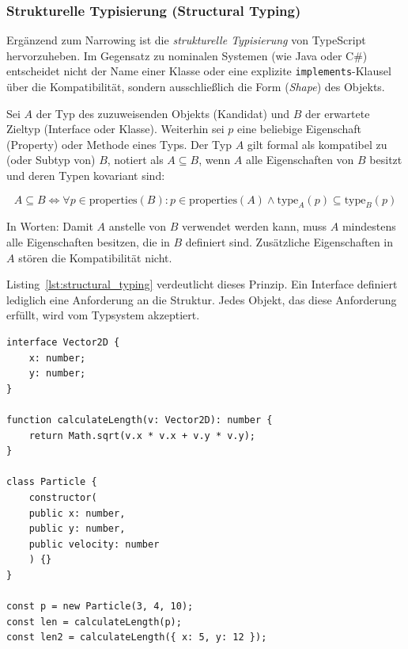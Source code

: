 \subsubsection{Strukturelle Typisierung (Structural Typing)}
Ergänzend zum Narrowing ist die \emph{strukturelle Typisierung} von TypeScript hervorzuheben. Im Gegensatz zu nominalen Systemen (wie Java oder C\#) entscheidet nicht der Name einer Klasse oder eine explizite \texttt{implements}-Klausel über die Kompatibilität, sondern ausschließlich die Form (\emph{Shape}) des Objekts.

Sei $A$ der Typ des zuzuweisenden Objekts (Kandidat) und $B$ der erwartete Zieltyp (Interface oder Klasse). Weiterhin sei $p$ eine beliebige Eigenschaft (Property) oder Methode eines Typs.
Der Typ $A$ gilt formal als kompatibel zu (oder Subtyp von) $B$, notiert als $A \subseteq B$, wenn $A$ alle Eigenschaften von $B$ besitzt und deren Typen kovariant sind:

\begin{equation}
	A \subseteq B \iff \forall p \in \text{properties}(B): p \in \text{properties}(A) \land \text{type}_A(p) \subseteq \text{type}_B(p)
	\label{eq:structural_typing}
\end{equation}

In Worten: Damit $A$ anstelle von $B$ verwendet werden kann, muss $A$ mindestens alle Eigenschaften besitzen, die in $B$ definiert sind. Zusätzliche Eigenschaften in $A$ stören die Kompatibilität nicht.

Listing~\ref{lst:structural_typing} verdeutlicht dieses Prinzip. Ein Interface definiert lediglich eine Anforderung an die Struktur. Jedes Objekt, das diese Anforderung erfüllt, wird vom Typsystem akzeptiert.

\begin{listing}[H]
	\caption{Implizite Kompatibilität ohne explizite Implementierung}
	\label{lst:structural_typing}
	\begin{verbatim}
interface Vector2D {
	x: number;
	y: number;
}

function calculateLength(v: Vector2D): number {
	return Math.sqrt(v.x * v.x + v.y * v.y);
}

class Particle {
	constructor(
	public x: number, 
	public y: number, 
	public velocity: number
	) {}
}

const p = new Particle(3, 4, 10);
const len = calculateLength(p);
const len2 = calculateLength({ x: 5, y: 12 });
	\end{verbatim}
\end{listing}

